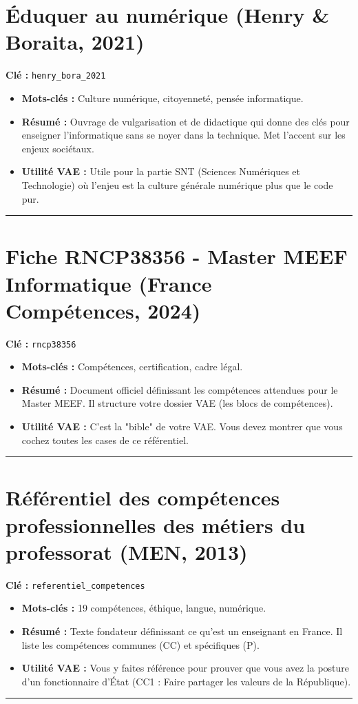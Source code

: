 \section{Éduquer au numérique (Henry \& Boraita, 2021)}
\textbf{Clé :} \texttt{henry\_bora\_2021}
\begin{itemize}
    \item \textbf{Mots-clés :} Culture numérique, citoyenneté, pensée informatique.
    \item \textbf{Résumé :} Ouvrage de vulgarisation et de didactique qui donne des clés pour enseigner l'informatique sans se noyer dans la technique. Met l'accent sur les enjeux sociétaux.
    \item \textbf{Utilité VAE :} Utile pour la partie SNT (Sciences Numériques et Technologie) où l'enjeu est la culture générale numérique plus que le code pur.
\end{itemize}
\hrule

\section{Fiche RNCP38356 - Master MEEF Informatique (France Compétences, 2024)}
\textbf{Clé :} \texttt{rncp38356}
\begin{itemize}
    \item \textbf{Mots-clés :} Compétences, certification, cadre légal.
    \item \textbf{Résumé :} Document officiel définissant les compétences attendues pour le Master MEEF. Il structure votre dossier VAE (les blocs de compétences).
    \item \textbf{Utilité VAE :} C'est la "bible" de votre VAE. Vous devez montrer que vous cochez toutes les cases de ce référentiel.
\end{itemize}
\hrule

\section{Référentiel des compétences professionnelles des métiers du professorat (MEN, 2013)}
\textbf{Clé :} \texttt{referentiel\_competences}
\begin{itemize}
    \item \textbf{Mots-clés :} 19 compétences, éthique, langue, numérique.
    \item \textbf{Résumé :} Texte fondateur définissant ce qu'est un enseignant en France. Il liste les compétences communes (CC) et spécifiques (P).
    \item \textbf{Utilité VAE :} Vous y faites référence pour prouver que vous avez la posture d'un fonctionnaire d'État (CC1 : Faire partager les valeurs de la République).
\end{itemize}
\hrule

